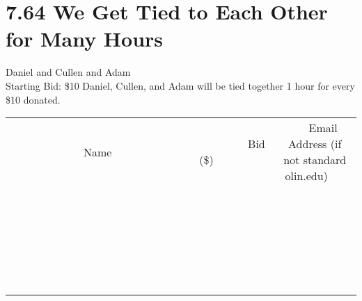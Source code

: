 \documentclass[11pt]{article}
\begin{document}
\section*{7.64 We Get Tied to Each Other for Many Hours}
Daniel and Cullen and Adam
\\
Starting Bid: \$10
\newline
Daniel, Cullen, and Adam will be tied together 1 hour for every \$10 donated.
\\[6ex]
\begin{tabular}{c c c}
~~~~~~~~~~~~~Name~~~~~~~~~~~~~ & ~~~~~~~~~Bid (\$)~~~~~~~~~  & ~~~Email Address (if not standard olin.edu)~~~\\
 & & \\
\hline
 & & \\
\hline
 & & \\
\hline
 & & \\
\hline
 & & \\
\hline
 & & \\
\hline
 & & \\
\hline
 & & \\
\hline
 & & \\
\hline
 & & \\
\hline
 & & \\
\hline
 & & \\
\hline
 & & \\
\hline
 & & \\
\hline
 & & \\
\hline
 & & \\
\hline
 & & \\
\hline
 & & \\
\hline
 & & \\
\hline
 & & \\
\hline
 & & \\
\hline
 & & \\
\hline
 & & \\
\hline
 & & \\
\hline
 & & \\
\hline
 & & \\
\hline
\end{tabular}
\newpage
\end{document}
